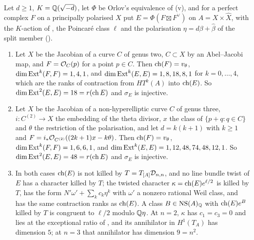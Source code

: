 \begin{theorem}[Twisted certificates at $n=2$ and $n=3$]
\label{thm:twistedcert}
Let $d\ge1$, $K=\mathbb{Q}(\sqrt{-d})$, let $\Phi$ be Orlov's equivalence of
(v), and for a perfect complex $F$ on a principally
polarised $X$ put $E=\Phi(F\boxtimes F^{\vee})$ on $A=X\times\widehat{X}$,
with the $K$-action of \cite[(29)]{paperI}, the Poincar\'e class $\ell$ and the
polarisation $\eta=d\beta+\widehat\beta$ of the split member
(\cite[Notation~15.1]{paperI}).
\begin{enumerate}[label=\textup{(\roman*)},leftmargin=2.6em,itemsep=2pt]
\item Let $X$ be the Jacobian of a curve $C$ of genus two, $C\subset X$ by an
  Abel--Jacobi map, and $F=\mathcal{O}_{C}(p)$ for a point $p\in C$. Then
  $\operatorname{ch}(F)=v_{\theta}$, $\dim\operatorname{Ext}^{k}(F,F)=1,4,1$, and
  $\dim\operatorname{Ext}^{k}(E,E)=1,8,18,8,1$ for $k=0,\dots,4$, which are the ranks of
  contraction from $HT^{k}(A)$ into $\operatorname{ch}(E)$. So
  $\dim\operatorname{Ext}^{2}(E,E)=18=r(\operatorname{ch} E)$ and $\sigma_{E}$ is injective.
\item Let $X$ be the Jacobian of a non-hyperelliptic curve $C$ of genus three,
  $i\colon C^{(2)}\to X$ the embedding of the theta divisor, $x$ the class of
  $\{p+q:q\in C\}$ and $\theta$ the restriction of the polarisation, and let
  $d=k(k+1)$ with $k\ge1$ and $F=i_{*}\mathcal{O}_{C^{(2)}}((2k+1)x-k\theta)$. Then
  $\operatorname{ch}(F)=v_{\theta}$, $\dim\operatorname{Ext}^{k}(F,F)=1,6,6,1$, and
  $\dim\operatorname{Ext}^{k}(E,E)=1,12,48,74,48,12,1$. So $\dim\operatorname{Ext}^{2}(E,E)=48=r(\operatorname{ch} E)$
  and $\sigma_{E}$ is injective.
\item In both cases $\operatorname{ch}(E)$ is not killed by $T=T_{[A]}\mathcal{D}_{n,n}$, and no
  line bundle twist of $E$ has a character killed by $T$; the twisted
  character $\kappa=\operatorname{ch}(E)e^{\ell/2}$ is killed by $T$, has the form
  $N'\omega'+\sum_{k}c_{k}\eta^{k}$ with $\omega'$ a nonzero rational Weil
  class, and has the same contraction ranks as $\operatorname{ch}(E)$. A class
  $B\in\mathrm{NS}(A)_{\mathbb{Q}}$ with $\operatorname{ch}(E)e^{B}$ killed by $T$ is congruent to $\ell/2$
  modulo $\mathbb{Q}\eta$. At $n=2$,
  $\kappa$ has $c_{1}=c_{3}=0$ and lies at the exceptional ratio of
  , and its annihilator in $H^{1}(T_{A})$ has
  dimension $5$; at $n=3$ that annihilator has dimension $9=n^{2}$.
\end{enumerate}
\end{theorem}

